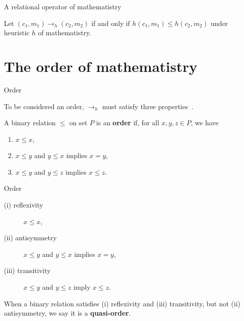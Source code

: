 \documentclass{beamer}
\begin{document}

\begin{frame}{A relational operator of mathematistry}

\begin{definition}\label{def:om}
Let $(c_1, m_1) \to_h (c_2, m_2)$ if and only if $h(c_1, m_1) \leqslant h(c_2, m_2)$ under heuristic $h$ of mathematistry.
\end{definition}



\end{frame}


\section{The order of mathematistry}


\begin{frame}{Order}

To be considered an order, $\to_h$ must satisfy three properties~\cite{davey_introduction_2002-1}.

\vspace{1.5cm}

\begin{defn}\label{def:order}
A binary relation $\leqslant$ on set $P$ is an \textbf{order} if, for all $x, y, z \in P$, we have
\begin{enumerate}[label=(\roman*)]
    \item $x \leqslant x$,
    \item $x \leqslant y$ and $y \leqslant x$ implies $x = y$,
    \item $x \leqslant y$ and $y \leqslant z$ implies $x \leqslant z$.
\end{enumerate}

\end{defn}

\end{frame}



\begin{frame}{Order}

\begin{description}%
    \item[(i) reflexivity] $x \leqslant x$,
    \item[(ii) antisymmetry] $x \leqslant y$ and $y \leqslant x$ implies $x = y$,
    \item[(iii) transitivity] $x \leqslant y$ and $y \leqslant z$ imply $x \leqslant z$.
\end{description}

\vspace{1.5cm}

When a binary relation satisfies (i) reflexivity and (iii) transitivity, but not (ii) antisymmetry, we say it is a \textbf{quasi-order}.


 \end{frame}
\end{document}
